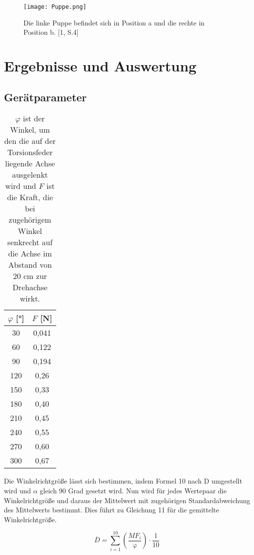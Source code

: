 \documentclass[titlepage = firstcover]{scrartcl}
\begin{document}
      \begin{figure}[h]
        \centering
        \texttt{[image: Puppe.png]}
        \caption{Die linke Puppe befindet sich in Position a und die rechte in Position b. [1, S.4]}
      \end{figure}

    \section{Ergebnisse und Auswertung}

      \subsection{Gerätparameter}
      \begin{table}[h]
        \centering
        \caption{$\varphi$ ist der Winkel, um den die auf der Torsionsfeder liegende Achse ausgelenkt wird und $F$ ist die Kraft, die bei zugehörigem Winkel senkrecht auf die Achse im Abstand von 20 cm zur Drehachse wirkt.}
        \label{tab:Tabelle_1}

        \begin{tabular}{c c}
          \toprule
          {$\varphi$ [°]} & {$F$ [N]} \\
          \midrule
          30 & 0,041 \\
          60 & 0,122 \\
          90 & 0,194 \\
          120 & 0,26 \\
          150 & 0,33 \\
          180 & 0,40 \\
          210 & 0,45 \\
          240 & 0,55 \\
          270 & 0,60 \\
          300 & 0,67 \\
          \bottomrule
        \end{tabular}
      \end{table}
      
      Die Winkelrichtgröße lässt sich bestimmen, indem Formel 10 nach D umgestellt wird und $\alpha$ gleich 90 Grad gesetzt wird. Nun wird für jedes Wertepaar die
      Winkelrichtgröße und daraus der Mittelwert mit zugehörigen Standardabweichung des Mittelwerts bestimmt. Dies führt zu Gleichung 11 für die gemittelte Winkelrichtgröße.

      \begin{equation*}
        \overline{D} = \sum_{i=1}^{10} (\frac{MF_i}{\upvarphi}) \cdot \frac{1}{10}
      \end{equation*}
\end{document}
